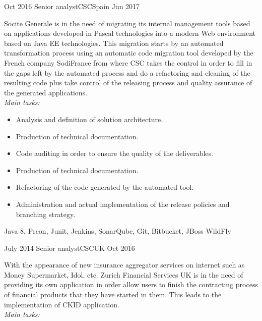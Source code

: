 \begin{experiences}
  \emptySeparator
  
    \experience
    {Oct 2016} {Senior analyst}{CSC}{Spain}
    {Jun 2017}    {

Socite Generale is in the need of migrating its internal management tools based on applications
developed in Pascal technologies into a modern Web environment based on Java EE
technologies. This migration starts by an automated transformation process using an automatic
code migration tool developed by the French company SodiFrance from where CSC takes the
control in order to fill in the gaps left by the automated process and do a refactoring and
cleaning of the resulting code plus take control of the releasing process and quality assurance of the generated applications.
\\
\emph{Main tasks:}
    	
                      \begin{itemize}
                        \item Analysis and definition of solution architecture.
                        \item Production of technical documentation.
                        \item Code auditing in order to ensure the quality of the deliverables.
                        \item Production of technical documentation.
                        \item Refactoring of the code generated by the automated tool.
                        \item Administration and actual implementation of the release policies and branching strategy.
                      \end{itemize}
                    }
                    {Java 8, Preon, Junit, Jenkins, SonarQube, Git, Bitbucket, JBoss
WildFly}
                    
  \emptySeparator   
  
    \experience
    {July 2014} {Senior analyst}{CSC}{UK}
    {Oct 2016}    {

With the appearance of new insurance aggregator services on internet such as Money
Supermarket, Idol, etc. Zurich Financial Services UK is in the need of providing its own
application in order allow users to finish the contracting process of financial products that they
have started in them. This leads to the implementation of CKID
application.
\\
\emph{Main tasks:}
    	
}
\end{experiences}
